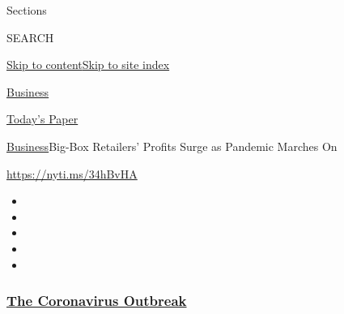 Sections

SEARCH

\protect\hyperlink{site-content}{Skip to
content}\protect\hyperlink{site-index}{Skip to site index}

\href{https://www.nytimes3xbfgragh.onion/section/business}{Business}

\href{https://myaccount.nytimes3xbfgragh.onion/auth/login?response_type=cookie\&client_id=vi}{}

\href{https://www.nytimes3xbfgragh.onion/section/todayspaper}{Today's
Paper}

\href{/section/business}{Business}\textbar{}Big-Box Retailers' Profits
Surge as Pandemic Marches On

\url{https://nyti.ms/34hBvHA}

\begin{itemize}
\item
\item
\item
\item
\item
\end{itemize}

\hypertarget{the-coronavirus-outbreak}{%
\subsubsection{\texorpdfstring{\href{https://www.nytimes3xbfgragh.onion/news-event/coronavirus?name=styln-coronavirus-markets\&region=TOP_BANNER\&variant=undefined\&block=storyline_menu_recirc\&action=click\&pgtype=Article\&impression_id=ad576bf0-e383-11ea-9f6a-a5fba7157dfa}{The
Coronavirus
Outbreak}}{The Coronavirus Outbreak}}\label{the-coronavirus-outbreak}}

